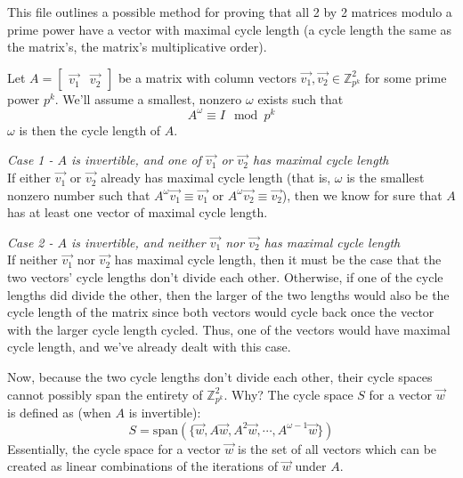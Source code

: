 \documentclass[a4paper, 12pt, reqno]{amsart}
\begin{document}
	This file outlines a possible method for proving that all 2 by 2 matrices modulo a prime power have a vector with maximal cycle length (a cycle length the same as the matrix's,
	the matrix's multiplicative order).
	
	Let $A = 
	\begin{bmatrix}
		\vec{v_1} & \vec{v_2}
	\end{bmatrix}$
	be a matrix with column vectors $\vec{v_1}, \vec{v_2} \in \mathds{Z}_{p^k}^2$ for some prime power $p^k$. We'll assume a smallest, nonzero $\omega$ exists such that 
	\[
		A^{\omega} \equiv I \mod{p^k}
	\]
	$\omega$ is then the cycle length of $A$.
	
	\emph{Case 1 - $A$ is invertible, and one of $\vec{v_1}$ or $\vec{v_2}$ has maximal cycle length} \\
	If either $\vec{v_1}$ or $\vec{v_2}$ already has maximal cycle length (that is, $\omega$ is the smallest nonzero number such that $A^{\omega}\vec{v_1} \equiv \vec{v_1}$
	or $A^{\omega}\vec{v_2} \equiv \vec{v_2}$), then we know for sure that $A$ has at least one vector of maximal cycle length.
	
	\emph{Case 2 - $A$ is invertible, and neither $\vec{v_1}$ nor $\vec{v_2}$ has maximal cycle length} \\
	If neither $\vec{v_1}$ nor $\vec{v_2}$ has maximal cycle length, then it must be the case that the two vectors' cycle lengths don't divide each other. Otherwise, if one of the
	cycle lengths did divide the other, then the larger of the two lengths would also be the cycle length of the matrix since both vectors would cycle back once the vector with
	the larger cycle length cycled. Thus, one of the vectors would have maximal cycle length, and we've already dealt with this case.
	
	Now, because the two cycle lengths don't divide each other, their cycle spaces cannot possibly span the entirety of $\mathds{Z}_{p^k}^2$. Why? The cycle space $S$ for a vector 
	$\vec{w}$ is defined as (when $A$ is invertible):
	\[
		S = \text{span}(\{\vec{w}, A\vec{w}, {A^2}\vec{w}, \cdots, {A^{\omega-1}}\vec{w}\})
	\]
	Essentially, the cycle space for a vector $\vec{w}$ is the set of all vectors which can be created as linear combinations of the iterations of $\vec{w}$ under $A$.
	
\end{document}
